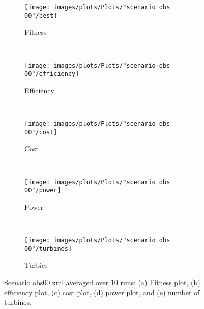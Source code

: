 \documentclass[12pt]{report}
\begin{document}
\begin{figure}[h!]
    \centering
      \begin{subfigure}[b]{0.31\textwidth}
        \texttt{[image: images/plots/Plots/"scenario obs 00"/best]}
        \caption{Fitness}
        \hfill
        \label{plot:fitness plot scenario obs 00}
    \end{subfigure}
    ~
      \begin{subfigure}[b]{0.31\textwidth}
        \texttt{[image: images/plots/Plots/"scenario obs 00"/efficiency]}
        \caption{Efficiency}
        \hfill
        \label{plot:single point crossover}
    \end{subfigure}
    ~
    \begin{subfigure}[b]{0.31\textwidth}
        \texttt{[image: images/plots/Plots/"scenario obs 00"/cost]}
        \caption{Cost}
        \hfill
        \label{plot:single point crossover}
    \end{subfigure}
    ~
    \begin{subfigure}[b]{0.31\textwidth}
        \texttt{[image: images/plots/Plots/"scenario obs 00"/power]}
        \caption{Power}
        \hfill
        \label{plot:two point crossover}
    \end{subfigure}
    ~
    \begin{subfigure}[b]{0.31\textwidth}
        \texttt{[image: images/plots/Plots/"scenario obs 00"/turbines]}
        \caption{Turbies}
        \hfill
        \label{plot:uniform crossover}
    \end{subfigure}
    \caption{Scenario obs00.xml averaged over 10 runs: (a) Fitness plot, (b) efficiency plot, (c) cost plot, (d) power plot, and (e) number of turbines.}
    \label{plot:master slave scenario obs 00}
\end{figure}
\end{document}
